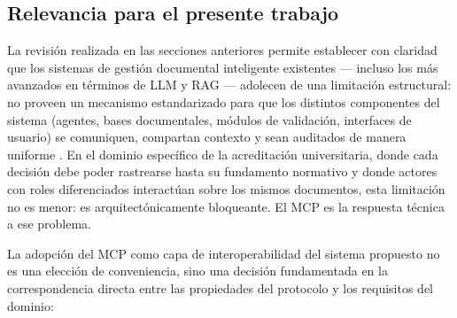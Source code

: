 \subsection{Relevancia para el presente trabajo}

La revisión realizada en las secciones anteriores permite establecer con claridad que los sistemas de gestión documental inteligente existentes --- incluso los más avanzados en términos de LLM y RAG --- adolecen de una limitación estructural: no proveen un mecanismo estandarizado para que los distintos componentes del sistema (agentes, bases documentales, módulos de validación, interfaces de usuario) se comuniquen, compartan contexto y sean auditados de manera uniforme \citep{ray2025survey}. En el dominio específico de la acreditación universitaria, donde cada decisión debe poder rastrearse hasta su fundamento normativo y donde actores con roles diferenciados interactúan sobre los mismos documentos, esta limitación no es menor: es arquitectónicamente bloqueante. El MCP es la respuesta técnica a ese problema.

La adopción del MCP como capa de interoperabilidad del sistema propuesto no es una elección de conveniencia, sino una decisión fundamentada en la correspondencia directa entre las propiedades del protocolo y los requisitos del dominio:

